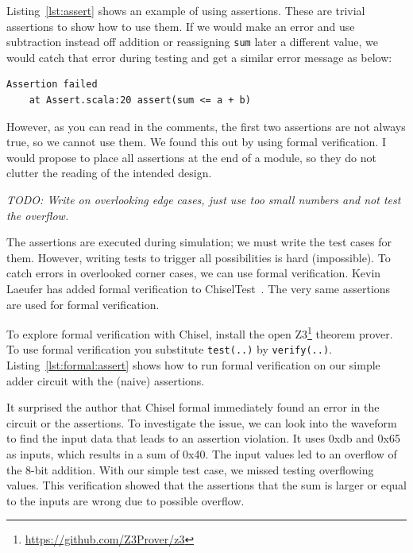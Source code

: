 \documentclass[%
    10pt,
    headinclude, footexclude,
    openright, %
    notitlepage,
    cleardoubleempty,
    headsepline,
    pointlessnumbers,
    bibtotoc, idxtotoc,
    ]{scrbook}
\newcommand{\code}[1]{{\lstinline[basicstyle=\small\ttfamily]{#1}}}
\newcommand{\todo}[1]{{\emph{TODO: #1}}}
\newcommand{\myref}[2]{\href{#1}{#2}}
\renewcommand{\myref}[2]{{#2}{\footnote{\url{#1}}}}
\begin{document}

Listing~\ref{lst:assert} shows an example of using assertions. These are trivial assertions
to show how to use them. If we would make an error and use subtraction instead off addition
or reassigning \code{sum} later a different value,
we would catch that error during testing and get a similar error message as below:

\begin{verbatim}
Assertion failed
    at Assert.scala:20 assert(sum <= a + b)
\end{verbatim}

However, as you can read in the comments, the first two assertions
are not always true, so we cannot use them. We found this out by
using formal verification.
I would propose to place all assertions at the end of a module,
so they do not clutter the reading of the intended design.

\todo{Write on overlooking edge cases, just use too small numbers and not
test the overflow.}

The assertions are executed during simulation; we must write the test cases
for them. However, writing tests to trigger all possibilities is hard (impossible).
To catch errors in overlooked corner cases, we can use formal verification.
Kevin Laeufer has added formal verification to ChiselTest~\cite{kevin:formal:woset2021}.
The very same assertions are used for formal verification.

To explore formal verification with Chisel, install
the open \myref{https://github.com/Z3Prover/z3}{Z3} theorem prover.
To use formal verification you substitute \code{test(..)} by \code{verify(..)}.
Listing~\ref{lst:formal:assert} shows how to run formal verification on our
simple adder circuit with the (naive) assertions.

It surprised the author that Chisel formal immediately found an error in the circuit or the assertions.
To investigate the issue, we can look into the waveform to find the input data
that leads to an assertion violation. It uses 0xdb and 0x65 as inputs, which results in
a sum of 0x40. The input values led to an overflow of the 8-bit addition.
With our simple test case, we missed testing overflowing values.
This verification showed that the assertions that the sum is larger or equal to
the inputs are wrong due to possible overflow.

\end{document}
